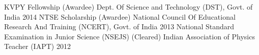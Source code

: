 \begin{cvhonors}
 \cvhonor
    {KVPY Fellowship (Awardee)}
    {Dept. Of Science and Technology (DST), Govt. of India}
    {}
    {2014}
 \cvhonor
    {NTSE Scholarship (Awardee)}
    {National Council Of Educational Research And Training (NCERT), Govt. of India}
    {}
    {2013}
 \cvhonor
    {National Standard Examination in Junior Science (NSEJS) (Cleared)}
    {Indian Association of Physics Teacher (IAPT)}
    {}
    {2012}
\end{cvhonors}

